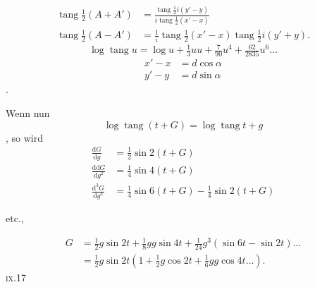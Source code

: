 \[
\begin{aligned}
\operatorname{tang}\tfrac12(A+A')&=
\frac{\operatorname{tang}\tfrac12 i(y'-y)}{i\operatorname{tang}\tfrac12(x'-x)}\\
\operatorname{tang}\tfrac12(A-A')&=\frac1i\operatorname{tang}\tfrac12(x'-x)
 \operatorname{tang}\tfrac12 i(y'+y).
\end{aligned}
\]
\noindent [Da]
\[
\log\operatorname{tang}u=\log u+\tfrac13uu+\tfrac7{90}u^4+\tfrac{62}{2835}u^6\ldots
\]
\[
\begin{aligned}
x'-x&=d\cos\alpha\\
y'-y&=d\sin\alpha
\end{aligned}
\]
.

Wenn nun
\[
\log\operatorname{tang}(t+G)=\log\operatorname{tang}t+g
\]
\noindent [ist], so wird
\[
\begin{aligned}
\frac{\mathrm dG}{\mathrm dg}&=\tfrac12\sin2(t+G)\\
\frac{\mathrm d\mathrm dG}{\mathrm dg^2}&=\tfrac14\sin4(t+G)\\
\frac{\mathrm d^3G}{\mathrm dg^3}&=\tfrac14\sin6(t+G)-\tfrac14\sin2(t+G)
\end{aligned}
\]
\centerline{etc.,}
\medskip
\noindent [folglich]
\[
\begin{aligned}
G&=\tfrac12g\sin2t+\tfrac18gg\sin4t+\tfrac1{24}g^3(\sin6t-\sin2t)\ldots\\
 &=\tfrac12g\sin2t(1+\tfrac12g\cos2t+\tfrac16gg\cos4t\ldots).
\end{aligned}
\]
\noindent\textsc{ix.}\hfill 17\hspace*{.13\linewidth}\par

